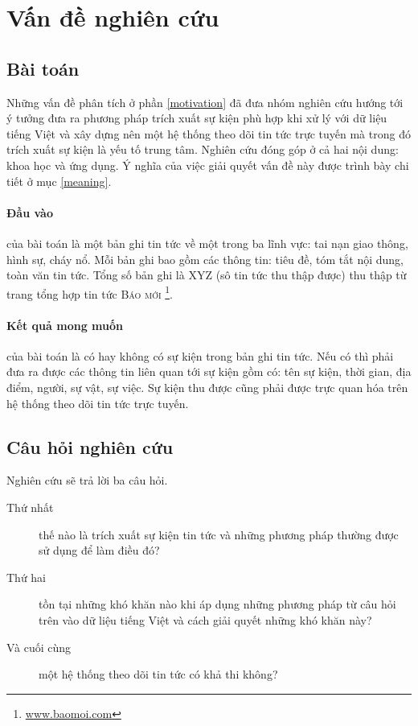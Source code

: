 \section{Vấn đề nghiên cứu}
\label{problem}
    \subsection{Bài toán}
     Những vấn đề phân tích ở phần \ref{motivation} đã đưa nhóm nghiên cứu hướng tới ý tưởng đưa ra phương pháp trích xuất sự kiện phù hợp khi xử lý với dữ liệu tiếng Việt và xây dựng nên một hệ thống theo dõi tin tức trực tuyến mà trong đó trích xuất sự kiện là yếu tố trung tâm. Nghiên cứu đóng góp ở cả hai nội dung: khoa học và ứng dụng. Ý nghĩa của việc giải quyết vấn đề này được trình bày chi tiết ở mục \ref{meaning}.
\paragraph{Đầu vào} của bài toán là một bản ghi tin tức về một trong  ba lĩnh vực: tai nạn giao thông, hình sự, cháy nổ. Mỗi bản ghi bao gồm các thông tin: tiêu đề, tóm tắt nội dung, toàn văn tin tức. Tổng số bản ghi là XYZ (sô tin tức thu thập được) thu thập từ trang tổng hợp tin tức \textsc{Báo mới} \footnote{\href{www.baomoi.com}{www.baomoi.com}}.

\paragraph{Kết quả mong muốn} của bài toán là có hay không có sự kiện trong bản ghi tin tức. Nếu có thì phải đưa ra được các thông tin liên quan tới sự kiện gồm có: tên sự kiện, thời gian, địa điểm, người, sự vật, sự việc. Sự kiện thu được cũng phải được trực quan hóa trên hệ thống theo dõi tin tức trực tuyến.
    \subsection{Câu hỏi nghiên cứu}
 \noindent Nghiên cứu sẽ trả lời ba câu hỏi.
 \begin{description}
 \item[Thứ nhất] thế nào là trích xuất sự kiện tin tức và những phương pháp thường được sử dụng để làm điều đó?
\item[Thứ hai] tồn tại những khó khăn nào  khi áp dụng những phương pháp từ câu hỏi trên vào dữ liệu tiếng Việt và cách giải quyết những khó khăn này?
\item[Và cuối cùng] một hệ thống theo dõi tin tức có khả thi không?
 \end{description}

